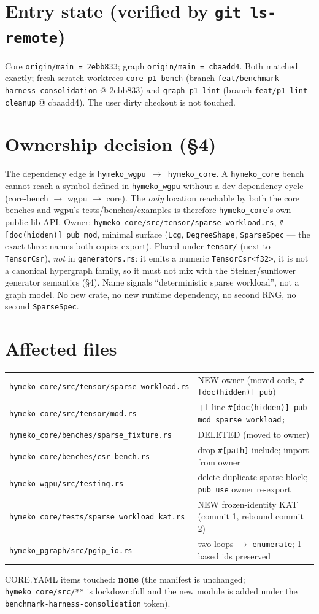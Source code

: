 \documentclass[11pt]{article}
\begin{document}
\section*{Entry state (verified by \texttt{git ls-remote})}
Core \texttt{origin/main = 2ebb833}; graph \texttt{origin/main = cbaadd4}. Both matched exactly; fresh
scratch worktrees \texttt{core-p1-bench} (branch \texttt{feat/benchmark-harness-consolidation} @ 2ebb833)
and \texttt{graph-p1-lint} (branch \texttt{feat/p1-lint-cleanup} @ cbaadd4). The user dirty checkout is not
touched.

\section*{Ownership decision (\S4)}
The dependency edge is \texttt{hymeko\_wgpu $\rightarrow$ hymeko\_core}. A \texttt{hymeko\_core} bench cannot
reach a symbol defined in \texttt{hymeko\_wgpu} without a dev-dependency cycle
(core-bench $\rightarrow$ wgpu $\rightarrow$ core). The \emph{only} location reachable by both the core
benches and wgpu's tests/benches/examples is therefore \texttt{hymeko\_core}'s own public lib API. Owner:
\texttt{hymeko\_core/src/tensor/sparse\_workload.rs}, \texttt{\#[doc(hidden)] pub mod}, minimal surface
(\texttt{Lcg}, \texttt{DegreeShape}, \texttt{SparseSpec} --- the exact three names both copies export).
Placed under \texttt{tensor/} (next to \texttt{TensorCsr}), \emph{not} in \texttt{generators.rs}: it emits a
numeric \texttt{TensorCsr<f32>}, it is not a canonical hypergraph family, so it must not mix with the
Steiner/sunflower generator semantics (\S4). Name signals ``deterministic sparse workload'', not a graph
model. No new crate, no new runtime dependency, no second RNG, no second \texttt{SparseSpec}.

\section*{Affected files}
\begin{longtable}{l l}
\texttt{hymeko\_core/src/tensor/sparse\_workload.rs} & NEW owner (moved code, \texttt{\#[doc(hidden)] pub}) \\
\texttt{hymeko\_core/src/tensor/mod.rs} & +1 line \texttt{\#[doc(hidden)] pub mod sparse\_workload;} \\
\texttt{hymeko\_core/benches/sparse\_fixture.rs} & DELETED (moved to owner) \\
\texttt{hymeko\_core/benches/csr\_bench.rs} & drop \texttt{\#[path]} include; import from owner \\
\texttt{hymeko\_wgpu/src/testing.rs} & delete duplicate sparse block; \texttt{pub use} owner re-export \\
\texttt{hymeko\_core/tests/sparse\_workload\_kat.rs} & NEW frozen-identity KAT (commit 1, rebound commit 2) \\
\texttt{hymeko\_pgraph/src/pgip\_io.rs} & two loops $\rightarrow$ \texttt{enumerate}; 1-based ids preserved \\
\end{longtable}
CORE.YAML items touched: \textbf{none} (the manifest is unchanged; \texttt{hymeko\_core/src/**} is
lockdown:full and the new module is added under the \texttt{benchmark-harness-consolidation} token).
\end{document}
